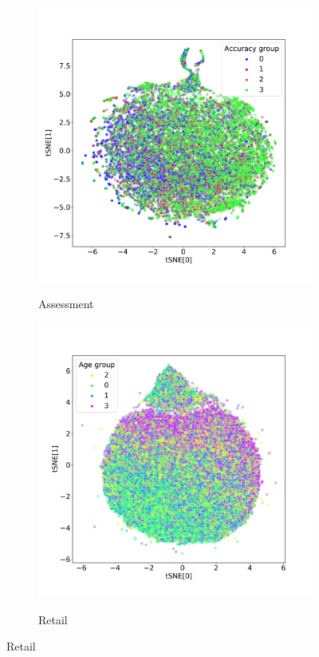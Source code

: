 \documentclass[sigconf, anonymous]{acmart}
\begin{document}
\begin{figure}
\begin{subfigure}{0.5\textwidth}
    \label{fig-tsne-churn}
  \end{subfigure}
  \begin{subfigure}{0.5\textwidth}
    \caption{Assessment}
    \includegraphics[width=\textwidth]{figures/iclr-bowl-tsne-accuracy_group.pdf}
    \label{fig-tsne-bowl}
  \end{subfigure}%
  \begin{subfigure}{0.5\textwidth}
    \caption{Retail}
    \includegraphics[width=\textwidth]{figures/iclr-x5-tsne-age_bin.pdf}
    \label{fig-tsne-x5}
  \end{subfigure}
\end{figure}

\fi

\clearpage

\fi
\end{document}
